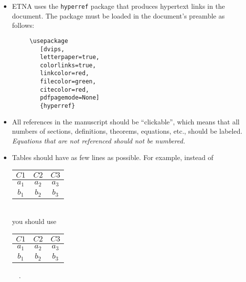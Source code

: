 \documentclass[10pt]{article}
\def\qed{~\vbox{\hrule\hbox{\vrule height1.3ex\hskip0.8ex\vrule}\hrule}}
\begin{document}
\begin{itemize}
word and the ``endproof'' symbol (Halmos box). This is achieved as follows:
%
\begin{verbatim}     \begin{proof} Text of the proof.  $\qquad$ \end{proof}\end{verbatim}
%
If the proof ends with a displayed equation you should use the following:
%
\begin{verbatim}
     {\em Proof}. Text of the proof.
     $$a^2+b^2=c^2. \qquad\endproof$$
\end{verbatim}
%
You can also generate a command for the ``endproof'' symbol by adding
%
\begin{verbatim}
     \def\qed{~\vbox{\hrule\hbox
        {\vrule height1.3ex\hskip0.8ex\vrule}\hrule}}
\end{verbatim}
%
to your tex-file. Typing {\tt \char`\\qed} in a formula then produces
the symbol $\qed\,$.
%
\item ETNA uses the {\tt hyperref} package that
produces hypertext links in the document. The package must be loaded
in the document's preamble as follows:
%
\begin{verbatim}
     \usepackage
        [dvips,
        letterpaper=true,
        colorlinks=true,
        linkcolor=red,
        filecolor=green,
        citecolor=red,
        pdfpagemode=None]
        {hyperref}
\end{verbatim}

\item All references in the manuscript should be ``clickable'', which
means that all numbers of sections, definitions, theorems, equations, etc.,
should be labeled. {\em Equations that are not referenced should not be numbered.}
%
\item Tables should have as few lines as possible. For example,
instead of\\

\hspace{2cm}\begin{tabular}{|c|c|c|}\hline
$C1$ & $C2$ & $C3$ \\ \hline
$a_1$ & $a_2$ & $a_3$ \\ \hline
$b_1$ & $b_2$ & $b_3$ \\ \hline
\end{tabular}\\

you should use\\

\hspace{2cm}\begin{tabular}{c|c|c}
$C1$ & $C2$ & $C3$ \\ \hline
$a_1$ & $a_2$ & $a_3$ \\
$b_1$ & $b_2$ & $b_3$
\end{tabular}~~.\\


\end{itemize}
\end{document}

